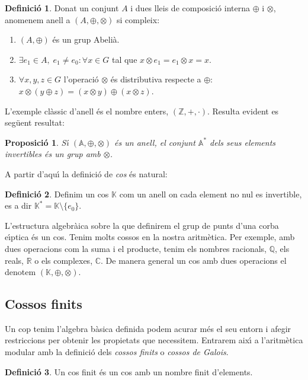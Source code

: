 \documentclass[12pt,twoside,catalan,a4paper]{book}%
\newtheorem{prop}[thm]{Proposici\'o}
\numberwithin{figure}{section}		%
\theoremstyle{definition}   			%
\newtheorem{defi}{Definici\'o}[chapter]%
\def\ce{corba e\lgem{}\'{\i}ptica}%
\def\cf{cos finit}%
\def\cfs{cossos finits}%
\def\Cfs{Cossos finits}%
\newcommand{\Z}{\ensuremath{\mathbb{Z}}}%
\newcommand{\Q}{\ensuremath{\mathbb{Q}}}%
\newcommand{\R}{\ensuremath{\mathbb{R}}}%
\newcommand{\C}{\ensuremath{\mathbb{C}}}%
\newcommand{\K}{\ensuremath{\mathbb{K}}}%
\theoremstyle{saltolinea}   			%
\begin{document}
\begin{defi}\label{def:ring}
Donat un conjunt $A$ i dues lleis de composici\'o interna $\oplus$ i $\otimes$, anomenem anell a $(A,\oplus,\otimes)$ si compleix:
\begin{enumerate}
 \item $\left(A,\oplus\right)$ \'es un grup Abeli\`a.
 \item $\exists e_1 \in A,\; e_1\ne e_0: \forall x \in G$ tal que $x \otimes e_1 = e_1 \otimes x = x$.
 \item $\forall x,y,z \in G $ l'operaci\'o $\otimes$ \'es distributiva respecte a $\oplus$: $x \otimes \left( y \oplus z \right) = \left(x \otimes y \right) \oplus \left( x \otimes z \right)$.
\end{enumerate}
\end{defi}
L'exemple cl\`assic d'anell \'es el nombre enters, $\left(\Z,+,\cdot\right)$. Resulta evident es seg\"uent resultat:
\begin{prop}
 S\'{\i} $\left( \mathbb{A},\oplus,\otimes \right)$ \'es un anell, el conjunt $\mathbb{A}^*$ dels seus elements invertibles \'es un grup amb $\otimes$.
\end{prop}
A partir d'aqu\'{\i} la definici\'o de \emph{cos} \'es natural:
\begin{defi}
 Definim un cos $\K$ com un anell on cada element no nul es invertible, es a dir $\K^*=\K\setminus\{e_0\}$.
\end{defi}
L'estructura algebr\`aica sobre la que definirem el grup de punts d'una \ce{} \'es un cos. Tenim molts cossos en la nostra aritm\`etica. Per exemple, amb dues operacions com la suma i el producte, tenim els nombres racionals, $\Q$, els reals, $\R$ o els complexes, $\C$. De manera general un cos amb dues operacions el denotem $\left(\K,\oplus,\otimes\right)$.


\subsection{\Cfs{}}\label{sec:cfs}

Un cop tenim l'algebra b\`asica definida podem acurar m\'es el seu entorn i afegir restriccions per obtenir les propietats que necessitem. Entrarem aix\'{\i} a l'aritm\`etica modular amb la definici\'o dels \emph{\cfs} o \emph{cossos de Galois}.

\begin{defi}\label{def:finiteField} Un \cf{} \'es un cos amb un nombre finit d'elements.\end{defi}
\end{document}
